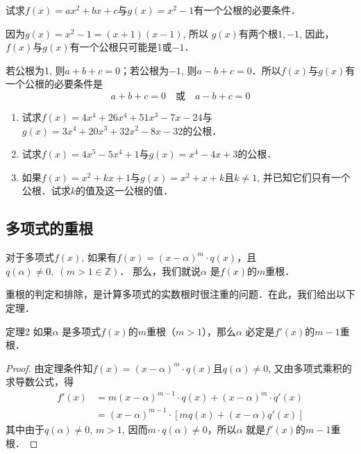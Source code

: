 \begin{example}
    试求$f(x)=ax^2+bx+c$与$g(x)=x^2-1$有一个公根的必要条件．
\end{example}

\begin{solution}
    因为$g(x)=x^2-1=(x+1)(x-1)$, 所以
    $g(x)$有两个根$1,-1$, 因此，$f(x)$与$g(x)$有一个公根只可能是1或$-1$．

若公根为1, 则$a+b+c=0$；若公根为$-1$, 则$a-b+c=0$．所以$f(x)$与$g(x)$有一个公根的必要条件是
\[a+b+c=0\quad \text{或}\quad a-b+c=0\]
\end{solution}

\begin{ex}
    \begin{enumerate}
        \item 试求$f(x)=4x^4+26x^4+51x^3-7x-24$与
$g(x)=3x^4+20x^3+32x^2-8x-32$的公根．
\item 试求$f(x)=4x^5-5x^4+1$与$g(x)=x^4-4x+3$的公根．
\item 如果$f(x)=x^2+kx+1$与$g(x)=x^2+x+k$且$k\ne 1$,
并已知它们只有一个公根．试求$k$的值及这一公根的值．
    \end{enumerate}
\end{ex}

\subsection{多项式的重根}

对于多项式$f(x)$, 如果有$f(x)=(x-\alpha )^m\cdot q(x)$，且$q(\alpha )\ne 0,\; (m>1\in\mathbb{Z})$．
那么，我们就说$\alpha$ 是$f(x)$的$m$重根．

重根的判定和排除，是计算多项式的实数根时很注重的问题．在此，我们给出以下定理．

\begin{blk}{定理2}
    如果$\alpha$ 是多项式$f(x)$的$m$重根（$m>1$），那么$\alpha$ 必定是$f'(x)$的$m-1$重根．
\end{blk}

\begin{proof}
    由定理条件知$f(x)=(x-\alpha )^m\cdot q(x)$且$q(\alpha )\ne 0$, 又由多项式乘积的求导数公式，得
\[\begin{split}
     f' (x) &=m (x-\alpha )^{m-1}\cdot q (x) + (x-\alpha )^m\cdot q'(x)\\
&=(x-\alpha ) ^{m-1}\cdot  [mq (x) + (x-\alpha ) q' (x) ]
\end{split}\]
其中由于$q(\alpha )\ne 0$, $m>1$, 因而$m\cdot q(\alpha )\ne 0$，所以$\alpha$ 就是$f'(x)$的$m-1$重根．
\end{proof}

